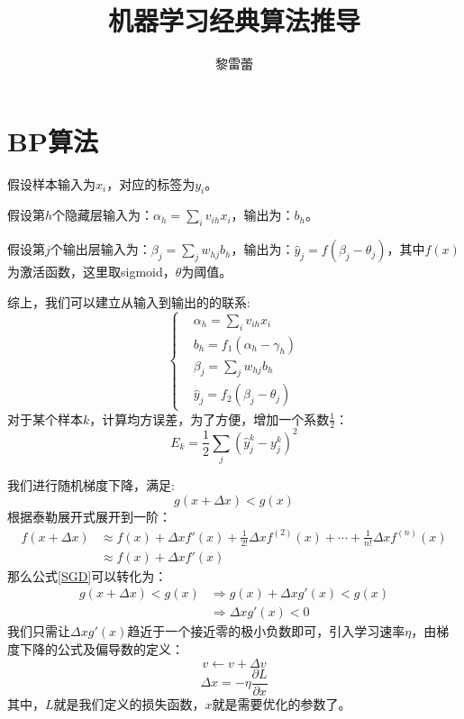 \documentclass[11pt]{report}
\title{机器学习经典算法推导}
\author{黎雷蕾}
\begin{document}
\maketitle
\tableofcontents
\chapter{BP算法}
假设样本输入为$x_i$，对应的标签为$y_i$。
\par
假设第$h$个隐藏层输入为：$\alpha_h=\sum_i v_{ih}x_i$，输出为：$b_h$。
\par
假设第$j$个输出层输入为：$\beta_j=\sum_j w_{hj}b_h$，输出为：$\hat{y}_j=f(\beta_j-\theta_j)$，其中$f(x)$为激活函数，这里取sigmoid，$\theta$为阈值。
\par
综上，我们可以建立从输入到输出的的联系:
\begin{equation}
\label{NN_process}
	\begin{cases}
		& \alpha_h=\sum_i v_{ih}x_i\\
		& b_h=f_1(\alpha_h-\gamma_h)\\
		& \beta_j=\sum_j w_{hj}b_h\\
		& \hat{y}_j=f_2(\beta_j-\theta_j)
	\end{cases}
\end{equation}
对于某个样本$k$，计算均方误差，为了方便，增加一个系数$\frac{1}{2}$：
\begin{equation}
	E_k=\frac{1}{2}\sum_j(\hat{y}_j^k-y_j^k)^2
\end{equation}
\par
我们进行随机梯度下降，满足:
\begin{equation}
\label{SGD}
	g(x+\Delta x)<g(x)
\end{equation}
根据泰勒展开式展开到一阶：
\begin{equation}
\begin{split}
	f(x+\Delta x)&\approx f(x)+\Delta xf'(x)+\frac{1}{2!}\Delta xf^{(2)}(x)+\cdots+\frac{1}{n!}\Delta xf^{(n)}(x)\\
	&\approx f(x)+\Delta xf'(x)
\end{split}
\end{equation}
那么公式\ref{SGD}可以转化为：
\begin{equation}
\begin{split}
	g(x+\Delta x)<g(x)&\Rightarrow g(x)+\Delta xg'(x)<g(x)\\
	&\Rightarrow \Delta xg'(x)<0
\end{split}
\end{equation}
我们只需让$\Delta xg'(x)$趋近于一个接近零的极小负数即可，引入学习速率$\eta$，由梯度下降的公式及偏导数的定义：
\begin{equation}
	v\leftarrow v+\Delta v
\end{equation}
\begin{equation}
\label{optimal_target}
	\Delta x =-\eta\frac{\partial L}{\partial x}
\end{equation}
其中，$L$就是我们定义的损失函数，$x$就是需要优化的参数了。
\end{document}
